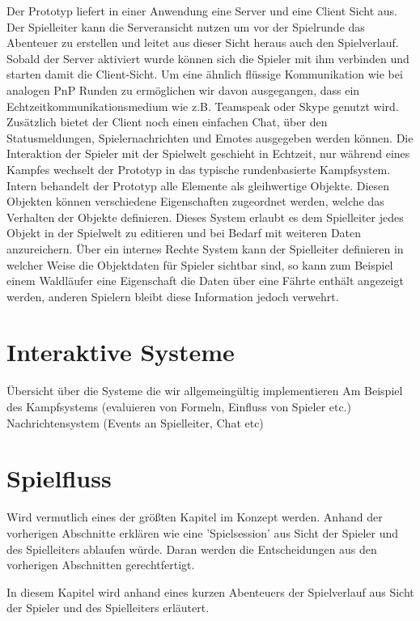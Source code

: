 Der Prototyp liefert in einer Anwendung eine Server und eine Client Sicht aus. Der Spielleiter kann die Serveransicht nutzen um vor der Spielrunde das Abenteuer zu erstellen und leitet aus dieser Sicht heraus auch den Spielverlauf. Sobald der Server aktiviert wurde können sich die Spieler mit ihm verbinden und starten damit die Client-Sicht. Um eine ähnlich flüssige Kommunikation wie bei analogen PnP Runden zu ermöglichen wir davon ausgegangen, dass ein Echtzeitkommunikationsmedium wie z.B. Teamspeak oder Skype genutzt wird. Zusätzlich bietet der Client noch einen einfachen Chat, über den Statusmeldungen, Spielernachrichten und Emotes ausgegeben werden können. 
Die Interaktion der Spieler mit der Spielwelt geschieht in Echtzeit, nur während eines Kampfes wechselt der Prototyp in das typische rundenbasierte Kampfsystem.
Intern behandelt der Prototyp alle Elemente als gleihwertige Objekte. Diesen Objekten können verschiedene Eigenschaften zugeordnet werden, welche das Verhalten der Objekte definieren. Dieses System erlaubt es dem Spielleiter jedes Objekt in der Spielwelt zu editieren und bei Bedarf mit weiteren Daten anzureichern.\newline
Über ein internes Rechte System kann der Spielleiter definieren in welcher Weise die Objektdaten für Spieler sichtbar sind, so kann zum Beispiel einem Waldläufer eine Eigenschaft die Daten über eine Fährte enthält angezeigt werden, anderen Spielern bleibt diese Information jedoch verwehrt.


\section{Interaktive Systeme}
\label{sec:InteraktiveSysteme}
Übersicht über die Systeme die wir allgemeingültig implementieren\newline
Am Beispiel des Kampfsystems (evaluieren von Formeln, Einfluss von Spieler etc.)\newline
Nachrichtensystem (Events an Spielleiter, Chat etc)\newline


\section{Spielfluss}
\label{sec:Spielfluss}
Wird vermutlich eines der größten Kapitel im Konzept werden. Anhand der vorherigen Abschnitte erklären wie eine 'Spielsession' aus Sicht der Spieler und des Spielleiters ablaufen würde. Daran werden die Entscheidungen aus den vorherigen Abschnitten gerechtfertigt.\newline
{}


In diesem Kapitel wird anhand eines kurzen Abenteuers der Spielverlauf aus Sicht der Spieler und des Spielleiters erläutert.